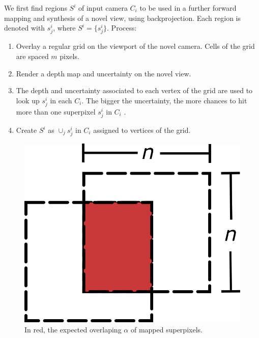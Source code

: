 We first find regions $S^{i}$ of input camera $C_{i}$
to be used in a further forward mapping and synthesis of a novel view,
using backprojection.
Each region is denoted with $s_{j}^{i}$, where $S^{i}=\{s_{j}^{i}\}$.
Process:
\begin{enumerate}
	\item Overlay a regular grid on the viewport of the novel camera. Cells of the grid are spaced $m$ pixels.
	\item Render a depth map and uncertainty on the novel view.
	\item The depth and uncertainty associated to each vertex of the grid are
	used to look up $s_{j}^{i}$ in each $C_{i}$. The bigger the uncertainty,
	the more chances to hit more than one superpixel $s_{j}^{i}$ in
	$C_{i}$ .
	\item Create $S^{i}$ as $\cup_j s_{j}^{i}$ in $C_{i}$ assigned to vertices of the grid.
\end{enumerate}

\begin{figure}[t]
	\centering
	\includegraphics[scale=0.25]{graphics/spixels_overlap.png}
	\caption{\label{fig:spixel_overlaping} 
	In red, the expected overlaping $\alpha$ of mapped superpixels.}
\end{figure}

